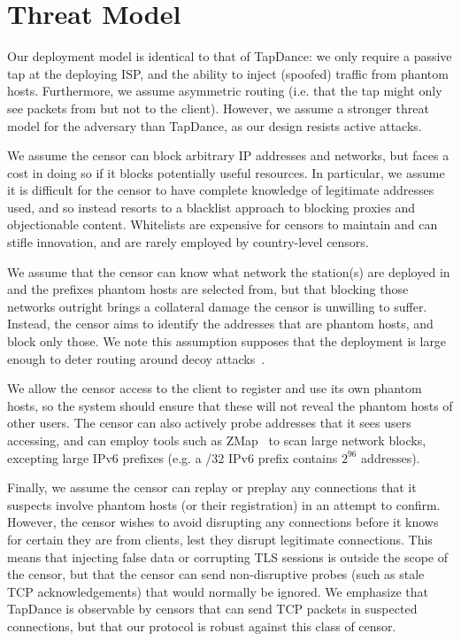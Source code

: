 \documentclass[sigconf,anonymous]{acmart}
\begin{document}



\section{Threat Model}


Our deployment model is identical to that of TapDance: we only require a passive
tap at the deploying ISP, and the ability to inject (spoofed) traffic from phantom
hosts.
Furthermore, we assume
asymmetric routing (i.e. that the tap might only see packets from but not to the
client).
However, we assume a stronger threat model for the adversary than
TapDance, as our design resists active attacks.


We assume the censor can block arbitrary IP addresses and networks, but faces a
cost in doing so if it blocks potentially useful resources. In particular, we
assume it is difficult for the censor to have complete knowledge of legitimate
addresses used, and so instead resorts to a blacklist approach to blocking
proxies and objectionable content.
Whitelists are expensive for censors to maintain and can stifle
innovation, and are rarely employed by country-level censors.


We assume that the censor can know what network the \scheme station(s) are
deployed in and the prefixes phantom hosts are selected from, but that blocking those
networks outright brings a collateral
damage the censor is unwilling to suffer. Instead, the censor aims to identify
the addresses that are phantom hosts, and block only those. We note this
assumption supposes that the deployment is large enough to deter routing around
decoy attacks~\cite{rad12,true-cost-rad}.

We allow the censor access to the client to register and use its own phantom hosts, 
so the system should ensure that these will not reveal the phantom hosts of other users. The
censor can also actively probe addresses that it sees users accessing, and can
employ tools such as ZMap~\cite{zmap13} to scan large network blocks, excepting
large IPv6 prefixes (e.g. a /32 IPv6 prefix contains $2^{96}$ addresses).

Finally, we assume the censor can replay or preplay any connections that it
suspects involve phantom hosts (or their registration) in an attempt to confirm.
However, the censor wishes to avoid disrupting any connections before it
knows for certain they are from \scheme clients, lest they disrupt legitimate
connections. This means that injecting false data or corrupting TLS sessions is
outside the scope of the censor, but that the censor can send non-disruptive
probes (such as stale TCP acknowledgements) that would normally
be ignored. We emphasize that TapDance is observable by censors that can send
TCP packets in suspected connections, but that our protocol is robust against
this class of censor.
\end{document}
